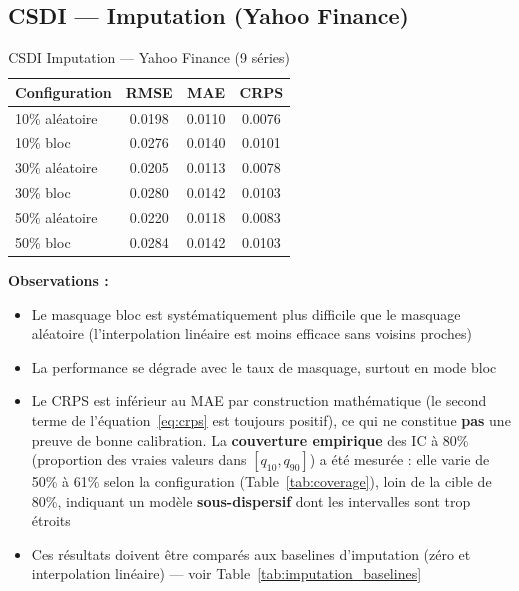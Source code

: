 \documentclass[12pt,a4paper]{article}
\begin{document}
\subsection{CSDI --- Imputation (Yahoo Finance)}

\begin{table}[H]
\centering
\caption{CSDI Imputation --- Yahoo Finance (9 s\'eries)}
\begin{tabular}{lccc}
\toprule
\textbf{Configuration} & \textbf{RMSE} & \textbf{MAE} & \textbf{CRPS} \\
\midrule
10\% al\'eatoire & 0.0198 & 0.0110 & 0.0076 \\
10\% bloc & 0.0276 & 0.0140 & 0.0101 \\
30\% al\'eatoire & 0.0205 & 0.0113 & 0.0078 \\
30\% bloc & 0.0280 & 0.0142 & 0.0103 \\
50\% al\'eatoire & 0.0220 & 0.0118 & 0.0083 \\
50\% bloc & 0.0284 & 0.0142 & 0.0103 \\
\bottomrule
\end{tabular}
\end{table}

\textbf{Observations :}
\begin{itemize}
    \item Le masquage bloc est syst\'ematiquement plus difficile que le masquage al\'eatoire (l'interpolation lin\'eaire est moins efficace sans voisins proches)
    \item La performance se d\'egrade avec le taux de masquage, surtout en mode bloc
    \item Le CRPS est inf\'erieur au MAE par construction math\'ematique (le second terme de l'\'equation~\eqref{eq:crps} est toujours positif), ce qui ne constitue \textbf{pas} une preuve de bonne calibration. La \textbf{couverture empirique} des IC \`a 80\% (proportion des vraies valeurs dans $[q_{10}, q_{90}]$) a \'et\'e mesur\'ee : elle varie de 50\% \`a 61\% selon la configuration (Table~\ref{tab:coverage}), loin de la cible de 80\%, indiquant un mod\`ele \textbf{sous-dispersif} dont les intervalles sont trop \'etroits
    \item Ces r\'esultats doivent \^etre compar\'es aux baselines d'imputation (z\'ero et interpolation lin\'eaire) --- voir Table~\ref{tab:imputation_baselines}
\end{itemize}
\end{document}
